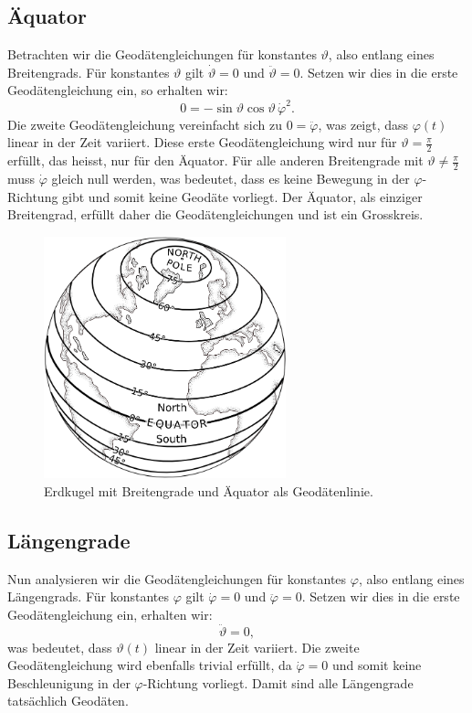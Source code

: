 \subsection{Äquator}
%
Betrachten wir die Geodätengleichungen für konstantes $\vartheta$, also entlang eines Breitengrads.
Für konstantes $\vartheta$ gilt $\dot{\vartheta} = 0$ und $\ddot{\vartheta} = 0$.
Setzen wir dies in die erste Geodätengleichung ein, so erhalten wir:
\begin{equation}
	0 = -\sin\vartheta \cos\vartheta \, \dot{\varphi}^2.
\end{equation}
Die zweite Geodätengleichung vereinfacht sich zu $0 = \ddot{\varphi}$, was zeigt, dass $\varphi(t)$ linear in der Zeit variiert.
Diese erste Geodätengleichung wird nur für $\vartheta = \frac{\pi}{2}$ erfüllt, das heisst, nur für den Äquator.
Für alle anderen Breitengrade mit $\vartheta \neq \frac{\pi}{2}$ muss $\dot{\varphi}$ gleich null werden, was bedeutet, dass es keine Bewegung in der $\varphi$-Richtung gibt und somit keine Geodäte vorliegt.
Der Äquator, als einziger Breitengrad, erfüllt daher die Geodätengleichungen und ist ein Grosskreis.

\begin{figure}
	\centering
	\includegraphics[width=7cm]{papers/geodaeten/Abbildungen/Standardverfahren/StaKugelBreitengrade}
	\caption{Erdkugel mit Breitengrade und Äquator als Geodätenlinie.}
	\label{geodaeten:figure:Standardverfahren:Breitengrade}
\end{figure}

\subsection{Längengrade}
Nun analysieren wir die Geodätengleichungen für konstantes $\varphi$, also entlang eines Längengrads.
Für konstantes $\varphi$ gilt $\dot{\varphi} = 0$ und $\ddot{\varphi} = 0$.
Setzen wir dies in die erste Geodätengleichung ein, erhalten wir:
\begin{equation}
	\ddot{\vartheta} = 0,
\end{equation}
was bedeutet, dass $\vartheta(t)$ linear in der Zeit variiert.
Die zweite Geodätengleichung wird ebenfalls trivial erfüllt, da $\dot{\varphi} = 0$ und somit keine Beschleunigung in der $\varphi$-Richtung vorliegt.
Damit sind alle Längengrade tatsächlich Geodäten.


